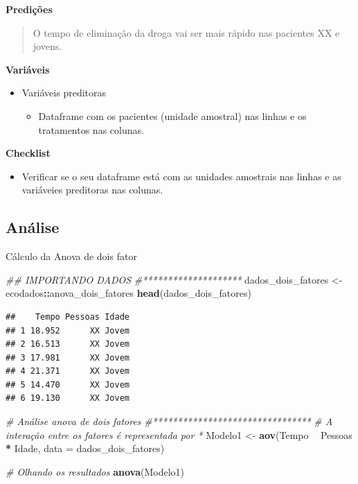 \documentclass[
]{book}
\newenvironment{Shaded}{\begin{snugshade}}{\end{snugshade}}
\newcommand{\CommentTok}[1]{\textcolor[rgb]{0.56,0.35,0.01}{\textit{#1}}}
\newcommand{\DataTypeTok}[1]{\textcolor[rgb]{0.13,0.29,0.53}{#1}}
\newcommand{\KeywordTok}[1]{\textcolor[rgb]{0.13,0.29,0.53}{\textbf{#1}}}
\newcommand{\NormalTok}[1]{#1}
\newcommand{\OperatorTok}[1]{\textcolor[rgb]{0.81,0.36,0.00}{\textbf{#1}}}
\newcommand{\StringTok}[1]{\textcolor[rgb]{0.31,0.60,0.02}{#1}}
\providecommand{\tightlist}{%
  \setlength{\itemsep}{0pt}\setlength{\parskip}{0pt}}
\begin{document}
\textbf{Predições}

\begin{quote}
O tempo de eliminação da droga vai ser mais rápido nas pacientes XX e jovens.
\end{quote}

\textbf{Variáveis}

\begin{itemize}
\tightlist
\item
  Variáveis preditoras

  \begin{itemize}
  \tightlist
  \item
    Dataframe com os pacientes (unidade amostral) nas linhas e os tratamentos nas colunas.
  \end{itemize}
\end{itemize}

\textbf{Checklist}

\begin{itemize}
\tightlist
\item
  Verificar se o seu dataframe está com as unidades amostrais nas linhas e as variáveies preditoras nas colunas.
\end{itemize}

\hypertarget{anuxe1lise-7}{%
\subsection{Análise}\label{anuxe1lise-7}}

Cálculo da Anova de dois fator

\begin{Shaded}
\begin{Highlighting}[]
\CommentTok{## IMPORTANDO DADOS}
\CommentTok{#********************}
\NormalTok{dados_dois_fatores <-}\StringTok{ }\NormalTok{ecodados}\OperatorTok{::}\NormalTok{anova_dois_fatores}
\KeywordTok{head}\NormalTok{(dados_dois_fatores) }
\end{Highlighting}
\end{Shaded}

\begin{verbatim}
##    Tempo Pessoas Idade
## 1 18.952      XX Jovem
## 2 16.513      XX Jovem
## 3 17.981      XX Jovem
## 4 21.371      XX Jovem
## 5 14.470      XX Jovem
## 6 19.130      XX Jovem
\end{verbatim}

\begin{Shaded}
\begin{Highlighting}[]
\CommentTok{# Análise anova de dois fatores }
\CommentTok{#********************************}
\CommentTok{# A interação entre os fatores é representada por *}
\NormalTok{Modelo1 <-}\StringTok{ }\KeywordTok{aov}\NormalTok{(Tempo }\OperatorTok{~}\StringTok{ }\NormalTok{Pessoas }\OperatorTok{*}\StringTok{ }\NormalTok{Idade, }\DataTypeTok{data =}\NormalTok{ dados_dois_fatores) }

\CommentTok{# Olhando os resultados}
\KeywordTok{anova}\NormalTok{(Modelo1)}
\end{Highlighting}
\end{Shaded}
\end{document}
